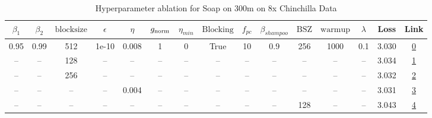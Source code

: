 \begin{table}[H]
\centering
\caption{Hyperparameter ablation for Soap on 300m on 8x Chinchilla Data}
\label{tab:ablation_soap_300m_on_8x_chinchilla_data}
\begin{tabular}{ccccccccccccccc}
\toprule
$\beta_1$ & $\beta_2$ & $\mathrm{block size}$ & $\epsilon$ & $\eta$ & $g_{\mathrm{norm}}$ & $\eta_{min}$ & $\mathrm{Blocking}$ & $f_{pc}$ & $\beta_{shampoo}$ & $\mathrm{BSZ}$ & $\mathrm{warmup}$ & $\lambda$ & Loss & Link \\
\midrule
0.95 & 0.99 & 512 & 1e-10 & 0.008 & 1 & 0 & True & 10 & 0.9 & 256 & 1000 & 0.1 & 3.030 & \href{https://wandb.ai/marin-community/optimizer-scaling/runs/sweep-300m-48B-soapeae57080lr0.008-wd0.1-minlr0-warmup1000-b10.9-f53d36}{0} \\
\midrule
-- & -- & 128 & -- & -- & -- & -- & -- & -- & -- & -- & -- & -- & 3.034 & \href{https://wandb.ai/marin-community/optimizer-scaling/runs/sweep-300m-48B-soape98b16alr0.008-wd0.1-minlr0-warmup1000-b10.95-76e70a}{1} \\
-- & -- & 256 & -- & -- & -- & -- & -- & -- & -- & -- & -- & -- & 3.032 & \href{https://wandb.ai/marin-community/optimizer-scaling/runs/sweep-300m-48B-soapec59568lr0.008-wd0.1-minlr0-warmup1000-b10.95-dc6b11}{2} \\
-- & -- & -- & -- & 0.004 & -- & -- & -- & -- & -- & -- & -- & -- & 3.031 & \href{https://wandb.ai/marin-community/optimizer-scaling/runs/sweep-300m-48B-soape9f5a41lr0.004-wd0.1-minlr0-warmup1000-b10.95-c462c4}{3} \\
-- & -- & -- & -- & -- & -- & -- & -- & -- & -- & 128 & -- & -- & 3.043 & \href{https://wandb.ai/marin-community/optimizer-scaling/runs/sweep-300m-48B-soapea631a39lr0.008-wd0.1-minlr0-warmup1000-b10.9-9b5fd4}{4} \\
\bottomrule
\end{tabular}
\end{table}

